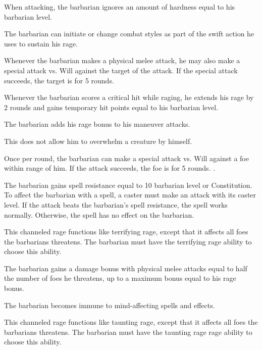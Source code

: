 When attacking, the barbarian ignores an amount of hardness equal to his barbarian level.

The barbarian can initiate or change combat styles as part of the swift action he uses to sustain his rage.

Whenever the barbarian makes a physical melee attack, he may also make a special attack vs. Will against the target of the attack.
If the special attack succeeds, the target is \shaken for 5 rounds.
\norepeatnotes

Whenever the barbarian scores a critical hit while raging, he extends his rage by 2 rounds and gains temporary hit points equal to his barbarian level.

The barbarian adds his rage bonus to his maneuver attacks.

This does not allow him to overwhelm a creature by himself.

Once per round, the barbarian can make a special attack vs. Will against a foe within \rngmed range of him.
If the attack succeeds, the foe is \taunted for 5 rounds.
\norepeatnotes.

The barbarian gains spell resistance equal to 10 \add barbarian level or Constitution.
To affect the barbarian with a spell, a caster must make an attack with its caster level.
If the attack beats the barbarian's spell resistance, the spell works normally.
Otherwise, the spell has no effect on the barbarian.

This channeled rage functions like terrifying rage, except that it affects all foes the barbarians threatens.
The barbarian must have the terrifying rage ability to choose this ability.

The barbarian gains a damage bonus with physical melee attacks equal to half the number of foes he threatens, up to a maximum bonus equal to his rage bonus.

The barbarian becomes immune to mind-affecting spells and effects.

This channeled rage functions like taunting rage, except that it affects all foes the barbarians threatens.
The barbarian must have the taunting rage rage ability to choose this ability.

